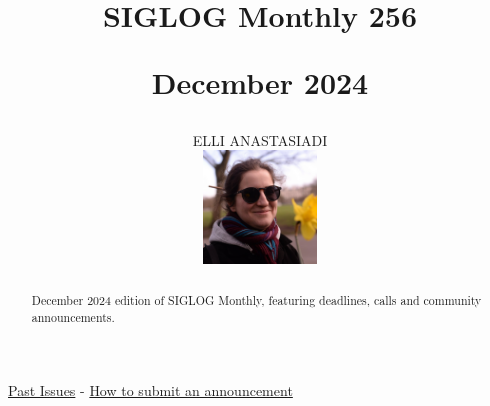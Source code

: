 \documentclass[prodmode,acmtecs]{acmsmall} %
\newcounter{colstart}
\begin{document}
\setcounter{colstart}{\thepage}

\title{{\huge\sc SIGLOG Monthly 256}

 December 2024}\author{ELLI ANASTASIADI\vspace*{-2.6cm}\begin{flushright}\includegraphics[width=30mm]{elli_anastasiadi.png}\end{flushright}}\begin{abstract}December 2024 edition of SIGLOG Monthly, featuring deadlines, calls and community announcements.
\end{abstract}


\maketitlee

\href{https://lics.siglog.org/newsletters/}{Past Issues}
 - 
\href{https://lics.siglog.org/newsletters/inst.html}{How to submit an announcement}
\end{document}
